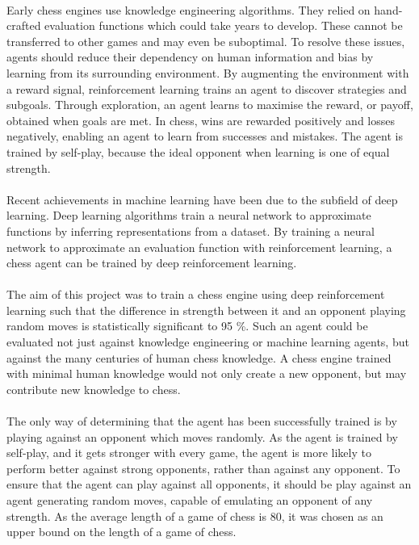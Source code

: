 \documentclass[12pt,a4paper]{book}
\begin{document}
\paragraph{} Early chess engines use knowledge engineering algorithms. They relied on hand-crafted evaluation functions which could take years to develop. \cite{stockfish} These cannot be transferred to other games and may even be suboptimal. To resolve these issues, agents should reduce their dependency on human information and bias by learning from its surrounding environment. By augmenting the environment with a reward signal, reinforcement learning trains an agent to discover strategies and subgoals. Through exploration, an agent learns to maximise the reward, or payoff, obtained when goals are met. \cite{Sutton} In chess, wins are rewarded positively and losses negatively, enabling an agent to learn from successes and mistakes. The agent is trained by self-play, because the ideal opponent when learning is one of equal strength. \cite{ban}

\paragraph{} Recent achievements in machine learning have been due to the subfield of deep learning. Deep learning algorithms train a neural network to approximate functions by inferring representations from a dataset. \cite{deeplearn} By training a neural network to approximate an evaluation function with reinforcement learning, a chess agent can be trained by deep reinforcement learning. \cite{AlphaGo} \cite{DQN}

\paragraph{} The aim of this project was to train a chess engine using deep reinforcement learning such that the difference in strength between it and an opponent playing random moves is statistically significant to 95 \%. Such an agent could be evaluated not just against knowledge engineering or machine learning agents, but against the many centuries of human chess knowledge. A chess engine trained with minimal human knowledge would not only create a new opponent, but may contribute new knowledge to chess.

\paragraph{} The only way of determining that the agent has been successfully trained is by playing against an opponent which moves randomly. As the agent is trained by self-play, and it gets stronger with every game, the agent is more likely to perform better against strong opponents, rather than against any opponent. To ensure that the agent can play against all opponents, it should be play against an agent generating random moves, capable of emulating an opponent of any strength. As the average length of a game of chess is 80, it was chosen as an upper bound on the length of a game of chess.
\end{document}
